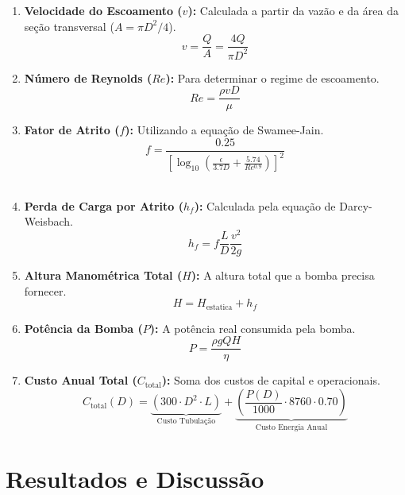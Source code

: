 \documentclass[12pt, a4paper]{article}
\begin{document}
        \begin{enumerate}
            \item \textbf{Velocidade do Escoamento ($v$):} Calculada a partir da vazão e da área da seção transversal ($A = \pi D^2 / 4$).
            \[ v = \frac{Q}{A} = \frac{4Q}{\pi D^2} \]

            \item \textbf{Número de Reynolds ($Re$):} Para determinar o regime de escoamento.
            \[ Re = \frac{\rho v D}{\mu} \]

            \item \textbf{Fator de Atrito ($f$):} Utilizando a equação de Swamee-Jain.
            \[ f = \frac{0.25}{\left[ \log_{10}\left( \frac{\epsilon}{3.7D} + \frac{5.74}{Re^{0.9}} \right) \right]^2} \] \

            \item \textbf{Perda de Carga por Atrito ($h_f$):} Calculada pela equação de Darcy-Weisbach.
            \[ h_f = f \frac{L}{D} \frac{v^2}{2g} \]

            \item \textbf{Altura Manométrica Total ($H$):} A altura total que a bomba precisa fornecer.
            \[ H = H_{\text{estatica}} + h_f \]

            \item \textbf{Potência da Bomba ($P$):} A potência real consumida pela bomba.
            \[ P = \frac{\rho g Q H}{\eta} \]

            \item \textbf{Custo Anual Total ($C_{\text{total}}$):} Soma dos custos de capital e operacionais.
            \[ C_{\text{total}}(D) = \underbrace{(300 \cdot D^2 \cdot L)}_{\text{Custo Tubulação}} + \underbrace{\left( \frac{P(D)}{1000} \cdot 8760 \cdot 0.70 \right)}_{\text{Custo Energia Anual}} \]
        \end{enumerate}


    \section{Resultados e Discussão}
\end{document}

